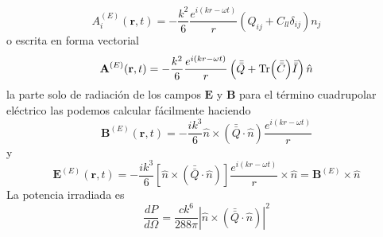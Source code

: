 \begin{equation*}
    A_{i}^{(E)}(\textbf{r},t)
    = -\frac{k^{2}}{6}
    \frac{e^{i(kr - \omega t)}}{r}
    \left(
        Q_{ij} + C_{ll}\delta_{ij}
    \right)n_{j}
\end{equation*}
o escrita en forma vectorial
\begin{equation*}
    \textbf{A}^{(E)}(\textbf{r},t)
    = -\frac{k^{2}}{6}
    \frac{e^{i(kr - \omega t)}}{r}
    \left(
        \bar{\bar{Q}} + \Tr(\bar{\bar{C}})\bar{\bar{I}}
    \right)\hat{n}
\end{equation*}
la parte solo de radiación de los campos $\textbf{E}$ y $\textbf{B}$ para el término cuadrupolar eléctrico las podemos calcular fácilmente haciendo
\begin{equation*}
    \textbf{B}^{(E)}(\textbf{r},t) 
    = -\frac{ik^{3}}{6}\hat{n}\times(\bar{\bar{Q}}\cdot \hat{n})
    \frac{e^{i(kr - \omega t)}}{r}
\end{equation*}
y
\begin{equation*}
    \textbf{E}^{(E)}(\textbf{r},t) 
    = -\frac{ik^{3}}{6}
    \left[
        \hat{n}\times
        \left(
            \bar{\bar{Q}}\cdot \hat{n}
        \right)
    \right]
    \frac{e^{i(kr - \omega t)}}{r}
    \times \hat{n}
    =
    \textbf{B}^{(E)}\times \hat{n}
\end{equation*}
La potencia irradiada es 
\begin{equation*}
    \frac{dP}{d\Omega} 
    = \frac{ck^{6}}{288\pi}
    \left|
        \hat{n}\times 
            \left(
                \bar{\bar{Q}}\cdot \hat{n}
            \right)
    \right|^{2}
\end{equation*}


